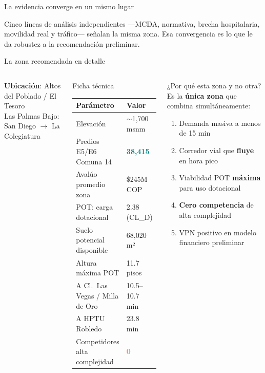 \documentclass[aspectratio=169, 11pt]{beamer}
\newcommand{\highlight}[1]{\textcolor{teal}{\textbf{#1}}}
\newcommand{\danger}[1]{\textcolor{coral}{\textbf{#1}}}
\begin{document}
{\begin{frame}{La evidencia converge en un mismo lugar}
\vspace{14pt}
\begin{center}
{\small Cinco líneas de análisis independientes ---MCDA, normativa, brecha hospitalaria, movilidad real y tráfico--- señalan la misma zona. Esa convergencia es lo que le da robustez a la recomendación preliminar.}
\end{center}
\end{frame}
}

\begin{frame}{La zona recomendada en detalle}

\begin{columns}[T]
{\small\textbf{Ubicación}: Altos del Poblado / El Tesoro}\\
{\scriptsize Las Palmas Bajo: San Diego $\rightarrow$ La Colegiatura}

\vspace{4pt}
\begin{block}{\small Ficha técnica}
\scriptsize
\begin{tabular}{@{}p{3.4cm}l@{}}
\toprule
\textbf{Parámetro} & \textbf{Valor} \\
\midrule
Elevación & $\sim$1,700 msnm \\
Predios E5/E6 Comuna 14 & \highlight{38,415} \\
Avalúo promedio zona & \$245M COP \\
POT: carga dotacional & 2.38 (CL\_D) \\
Suelo potencial disponible & 68,020 m² \\
Altura máxima POT & 11.7 pisos \\
A Cl.\ Las Vegas / Milla de Oro & 10.5--10.7 min \\
A HPTU Robledo & 23.8 min \\
Competidores alta complejidad & \danger{0} \\
\bottomrule
\end{tabular}
\end{block}

\vspace{2pt}
\begin{exampleblock}{\small ¿Por qué esta zona y no otra?}
\scriptsize
Es la \textbf{única zona} que combina simultáneamente:

\vspace{2pt}
\begin{enumerate}\setlength{\itemsep}{0pt}
  \item Demanda masiva a menos de 15 min
  \item Corredor vial que \textbf{fluye} en hora pico
  \item Viabilidad POT \textbf{máxima} para uso dotacional
  \item \textbf{Cero competencia} de alta complejidad
  \item VPN positivo en modelo financiero preliminar
\end{enumerate}
\end{exampleblock}


\end{columns}
\end{frame}
\end{document}

